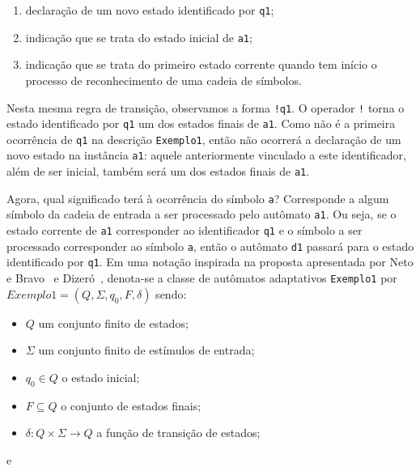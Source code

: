    \begin{enumerate}

   \item declaração de um novo estado identificado por \lstinline|q1|;

   \item indicação que se trata do estado inicial de \lstinline|a1|;

   \item indicação que se trata do primeiro estado corrente quando tem início o processo de reconhecimento de uma cadeia de símbolos.

   \end{enumerate}

Nesta mesma regra de transição, observamos a forma \lstinline|!q1|. O operador \lstinline|!| torna o estado identificado por \lstinline|q1| um dos estados finais de \lstinline|a1|. Como não é a primeira ocorrência de \lstinline|q1| na descrição \lstinline!Exemplo1!, então não ocorrerá a declaração de um novo estado na instância \lstinline!a1!: aquele anteriormente vinculado a este identificador, além de ser inicial, também será um dos estados finais de \lstinline|a1|.

Agora, qual significado terá à ocorrência do símbolo \lstinline|a|? Corresponde a algum símbolo da cadeia de entrada a ser processado pelo autômato \lstinline|a1|. Ou seja, se o estado corrente de \lstinline|a1| corresponder ao identificador \lstinline|q1| e o símbolo a ser processado corresponder ao símbolo \lstinline|a|, então o autômato \lstinline|d1| passará para o estado identificado por \lstinline|q1|. Em uma notação inspirada na proposta apresentada por Neto e Bravo~\cite{neto:bravo:2002} e Dizeró~\cite{dizero:2010}, denota-se a classe de autômatos adaptativos \lstinline|Exemplo1| por $\mathit{Exemplo1}=(Q, \Sigma, q_0, F, \delta)$ sendo:

	\begin{itemize}
	\item $Q$ um conjunto finito de estados;
	\item $\Sigma$ um conjunto finito de estímulos de entrada;
	\item $q_0 \in Q$ o estado inicial;
	\item $F\subseteq Q$ o conjunto de estados finais;
	\item $\delta:Q\times\Sigma \rightarrow Q$ a função de transição de estados;
	\end{itemize}

\noindent e

